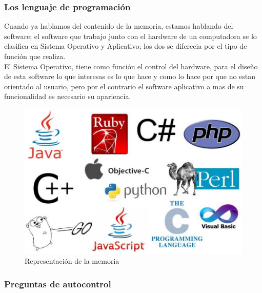 \documentclass[a4paper,12pt,spanish]{article}
\begin{document}
\subsubsection{Los lenguaje de programación}
\label{sec:lenguajes}
Cuando ya hablamos del contenido de la memoria, estamos hablando del software; el software que trabajo junto con el hardware de un computadora se lo clasifica en Sistema Operativo y Aplicativo; los dos se diferecia por el tipo de función que realiza.\\

El Sistema Operativo, tiene como función el control del hardware, para el diseño de esta software lo que interesas es lo que hace y como lo hace por que no estan orientado al usuario, pero por el contrario el software aplicativo a mas de su funcionalidad es necesario su apariencia. 

\begin{figure}[H]
  \centering
  \includegraphics[scale=0.5]{lenguaje}
  \caption{Representación de la memoria}
  \label{fig:memoria}
\end{figure}



\newpage
\subsubsection{Preguntas de autocontrol}
\label{sec:preg-de-autoc-1}
\end{document}
